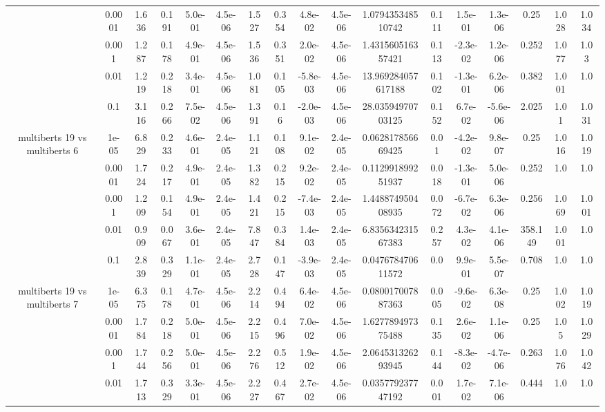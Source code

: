 \begin{tabular}{|c|c|c|c|c|c|c|c|c|c|c|c|c|c|c|c|c|}
 & 0.0001 & 1.636 & 0.191 & 5.0e-01 & 4.5e-06 & 1.527 & 0.354 & 4.8e-02 & 4.5e-06 & 1.079435348510742 & 0.111 & 1.5e-01 & 1.3e-06 & 0.25 & 1.028 & 1.034 \\
 & 0.001 & 1.287 & 0.178 & 4.9e-01 & 4.5e-06 & 1.536 & 0.351 & 2.0e-02 & 4.5e-06 & 1.431560516357421 & 0.113 & -2.3e-02 & 1.2e-06 & 0.252 & 1.077 & 1.03 \\
 & 0.01 & 1.219 & 0.218 & 3.4e-01 & 4.5e-06 & 1.081 & 0.105 & -5.8e-03 & 4.5e-06 & 13.969284057617188 & 0.102 & -1.3e-01 & 6.2e-06 & 0.382 & 1.001 & 1.0 \\
 & 0.1 & 3.116 & 0.266 & 7.5e-02 & 4.5e-06 & 1.391 & 0.16 & -2.0e-03 & 4.5e-06 & 28.03594970703125 & 0.152 & 6.7e-02 & -5.6e-06 & 2.025 & 1.01 & 1.031 \\
\hline
\multirow{5}{*}{multiberts 19 vs multiberts 6} & 1e-05 & 6.829 & 0.233 & 4.6e-01 & 2.4e-05 & 1.121 & 0.108 & 9.1e-02 & 2.4e-05 & 0.062817856669425 & 0.01 & -4.2e-02 & 9.8e-07 & 0.25 & 1.016 & 1.019 \\
 & 0.0001 & 1.724 & 0.217 & 4.9e-01 & 2.4e-05 & 1.382 & 0.215 & 9.2e-02 & 2.4e-05 & 0.112991899251937 & 0.018 & -1.3e-01 & 5.0e-06 & 0.252 & 1.0 & 1.0 \\
 & 0.001 & 1.209 & 0.154 & 4.9e-01 & 2.4e-05 & 1.421 & 0.215 & -7.4e-03 & 2.4e-05 & 1.448874950408935 & 0.072 & -6.7e-02 & 6.3e-06 & 0.256 & 1.069 & 1.001 \\
 & 0.01 & 0.909 & 0.067 & 3.6e-01 & 2.4e-05 & 7.847 & 0.384 & 1.4e-03 & 2.4e-05 & 6.835634231567383 & 0.257 & 4.3e-02 & 4.1e-06 & 358.149 & 1.001 & 1.0 \\
 & 0.1 & 2.839 & 0.329 & 1.1e-01 & 2.4e-05 & 2.728 & 0.147 & -3.9e-03 & 2.4e-05 & 0.047678470611572 & 0.0 & 9.9e-01 & 5.5e-07 & 0.708 & 1.0 & 1.0 \\
\hline
\multirow{5}{*}{multiberts 19 vs multiberts 7} & 1e-05 & 6.375 & 0.178 & 4.7e-01 & 4.5e-06 & 2.214 & 0.494 & 6.4e-02 & 4.5e-06 & 0.080017007887363 & 0.005 & -9.6e-02 & 6.3e-08 & 0.25 & 1.002 & 1.019 \\
 & 0.0001 & 1.784 & 0.218 & 5.0e-01 & 4.5e-06 & 2.215 & 0.496 & 7.0e-02 & 4.5e-06 & 1.627789497375488 & 0.135 & 2.6e-02 & 1.1e-06 & 0.25 & 1.05 & 1.029 \\
 & 0.001 & 1.744 & 0.256 & 5.0e-01 & 4.5e-06 & 2.276 & 0.512 & 1.9e-02 & 4.5e-06 & 2.064531326293945 & 0.144 & -8.3e-02 & -4.7e-06 & 0.263 & 1.076 & 1.042 \\
 & 0.01 & 1.713 & 0.329 & 3.3e-01 & 4.5e-06 & 2.227 & 0.467 & 2.7e-02 & 4.5e-06 & 0.035779237747192 & 0.001 & 1.7e-02 & 7.1e-06 & 0.444 & 1.0 & 1.0 \\

\end{tabular}
